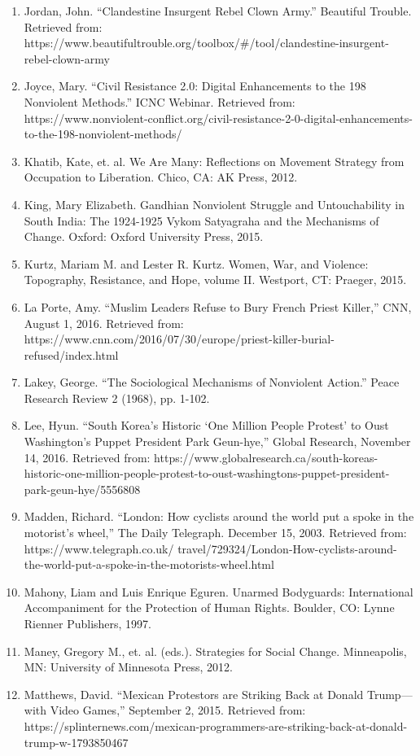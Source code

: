 \documentclass[twoside,a4paper,12pt,fleqn,openany]{extbook}
\begin{document}
\begin{enumerate}
\item Jordan, John. “Clandestine Insurgent Rebel Clown Army.” Beautiful Trouble. Retrieved from:
https://www.beautifultrouble.org/toolbox/#/tool/clandestine-insurgent-rebel-clown-army
\item Joyce, Mary. “Civil Resistance 2.0: Digital Enhancements to the 198 Nonviolent Methods.” ICNC Webinar. Retrieved from: https://www.nonviolent-conflict.org/civil-resistance-2-0-digital-enhancements-to-the-198-nonviolent-methods/
\item Khatib, Kate, et. al. We Are Many: Reflections on Movement Strategy from Occupation to Liberation. Chico, CA: AK Press, 2012.
\item King, Mary Elizabeth. Gandhian Nonviolent Struggle and Untouchability in South India: The
1924-1925 Vykom Satyagraha and the Mechanisms of Change. Oxford: Oxford University Press, 2015.
\item Kurtz, Mariam M. and Lester R. Kurtz. Women, War, and Violence: Topography, Resistance, and Hope, volume II. Westport, CT: Praeger, 2015.
\item La Porte, Amy. “Muslim Leaders Refuse to Bury French Priest Killer,” CNN, August 1, 2016. Retrieved from: https://www.cnn.com/2016/07/30/europe/priest-killer-burial-refused/index.html
\item Lakey, George. “The Sociological Mechanisms of Nonviolent Action.” Peace Research Review
2 (1968), pp. 1-102.
\item Lee, Hyun. “South Korea’s Historic ‘One Million People Protest’ to Oust Washington’s Puppet
President Park Geun-hye,” Global Research, November 14, 2016. Retrieved from: https://www.globalresearch.ca/south-koreas-historic-one-million-people-protest-to-oust-washingtons-puppet-president-park-geun-hye/5556808
\item Madden, Richard. “London: How cyclists around the world put a spoke in the motorist’s wheel,” The Daily Telegraph. December 15, 2003. Retrieved from: https://www.telegraph.co.uk/
travel/729324/London-How-cyclists-around-the-world-put-a-spoke-in-the-motorists-wheel.html
\item Mahony, Liam and Luis Enrique Eguren. Unarmed Bodyguards: International Accompaniment for the Protection of Human Rights. Boulder, CO: Lynne Rienner Publishers, 1997.
\item Maney, Gregory M., et. al. (eds.). Strategies for Social Change. Minneapolis, MN: University of Minnesota Press, 2012.
\item Matthews, David. “Mexican Protestors are Striking Back at Donald Trump—with Video Games,” September 2, 2015. Retrieved from: https://splinternews.com/mexican-programmers-are-striking-back-at-donald-trump-w-1793850467

\end{enumerate}
\end{document}
